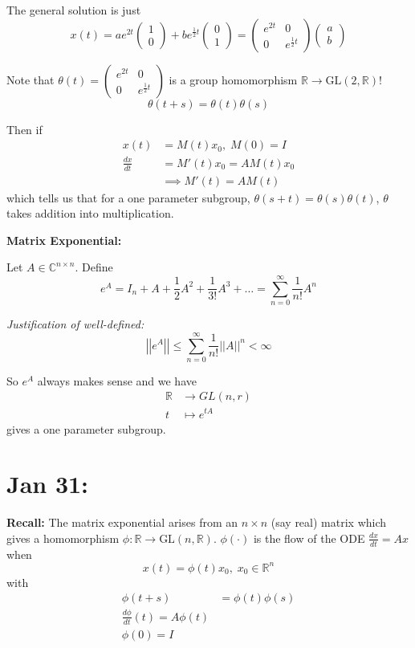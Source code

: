 \documentclass[12pt]{article}
\newcommand{\R}{\mathbb{R}}
\newcommand{\C}{\mathbb{C}}
\newcommand{\norm}[1]{\left\vert \left\vert #1 \right\vert \right\vert}
\newcommand{\GL}{\text{GL}}
\begin{document}
    The general solution is just 
    \[x(t) = ae^{2t} \begin{pmatrix}
        1\\0
    \end{pmatrix} + be^{\frac{1}{2}t} \begin{pmatrix}
        0\\1
    \end{pmatrix} = \begin{pmatrix}
        e^{2t} & 0\\ 
        0 & e^{\frac{1}{2}t}
    \end{pmatrix} \begin{pmatrix}
        a\\b
    \end{pmatrix}\]

    Note that $\theta(t) = \begin{pmatrix}
        e^{2t} & 0\\ 
        0 & e^{\frac{1}{2}t}
    \end{pmatrix}$ is a group homomorphism $\R \to \GL(2, \R)$! 
    \[\theta(t + s) = \theta(t) \theta(s)\]

    Then if 
    \begin{align*}
        x(t) &= M(t) x_0, \; M(0) = I\\ 
        \frac{dx}{dt} &= M'(t)x_0 = AM(t)x_0\\ 
        &\implies M'(t) = AM(t)
    \end{align*}
    which tells us that for a one parameter subgroup, $\theta(s + t) = \theta(s) \theta(t)$, $\theta$ takes addition into multiplication. 

    \textbf{Matrix Exponential:} 

    Let $A \in \C^{n\times n}$. Define 
    \[e^A = I_n + A + \frac{1}{2} A^2 + \frac{1}{3!} A^3 + \dots = \sum_{n=0}^{\infty} \frac{1}{n!}A^n\]

    \emph{Justification of well-defined:}
    \[\norm{e^A} \leq \sum_{n=0}^{\infty} \frac{1}{n!} \norm{A}^n < \infty\] 

    So $e^A$ always makes sense and we have 
    \begin{align*}
        \R &\to GL(n, r)\\
        t &\mapsto e^{tA}
    \end{align*} 
    gives a one parameter subgroup.

\section{Jan 31:}
    \textbf{Recall:} The matrix exponential arises from an $n \times n$ (say real) matrix which gives a homomorphism $\phi: \R \to \GL(n, \R)$. $\phi(\cdot)$ is the flow of the ODE $\frac{dx}{dt} = Ax$ when 
    \[x(t) = \phi(t) x_0, \; x_0 \in \R^n\]
    with
    \begin{align*}
        \phi(t + s) &= \phi(t) \phi(s)\\ 
        \frac{d\phi}{dt}(t) = A\phi(t)\\ 
        \phi(0) = I
    \end{align*}
    
\end{document}
